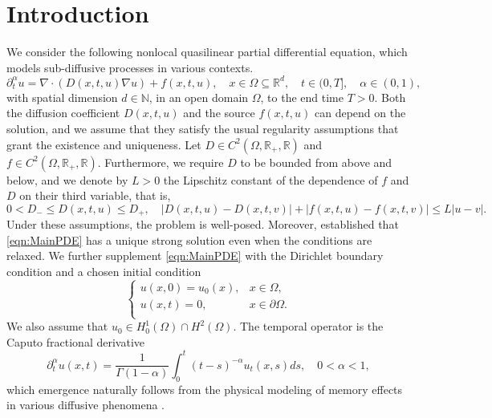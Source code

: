 \documentclass[12pt,a4paper]{article}
\begin{document}
\section{Introduction}
We consider the following nonlocal quasilinear partial differential equation, which models sub-diffusive processes in various contexts.
\begin{equation}\label{eqn:MainPDE}
	\partial^\alpha_t u = \nabla \cdot \left(D(x, t, u) \nabla u\right) + f(x,t,u), \quad x \in \Omega \subseteq \mathbb{R}^d, \quad t \in (0, T], \quad \alpha \in (0,1), 
\end{equation} 
with spatial dimension $d\in\mathbb{N}$, in an open domain $\Omega$, to the end time $T>0$. Both the diffusion coefficient $D(x,t,u)$ and the source $f(x,t,u)$ can depend on the solution, and we assume that they satisfy the usual regularity assumptions that grant the existence and uniqueness. Let $D\in C^2(\Omega, \mathbb{R}_+, \mathbb{R})$ and $f\in C^2(\Omega, \mathbb{R}_+, \mathbb{R})$. Furthermore, we require $D$ to be bounded from above and below, and we denote by $L>0$ the Lipschitz constant of the dependence of $f$ and $D$ on their third variable, that is,
\begin{equation}\label{eqn:Assumptions}
	0<D_-\leq D(x,t,u) \leq D_+, \quad |D(x,t,u)-D(x,t,v)| + |f(x,t,u) - f(x,t,v)| \leq L |u-v|.
\end{equation}
Under these assumptions, the problem is well-posed. Moreover, \cite{Zac12} established that \eqref{eqn:MainPDE} has a unique strong solution even when the conditions are relaxed. We further supplement \eqref{eqn:MainPDE} with the Dirichlet boundary condition and a chosen initial condition
\begin{equation}\label{eqn:MainPDEConditions}
	\begin{cases}
		u(x,0) = u_0(x), & x \in \Omega, \\
		u(x,t) = 0, & x \in \partial \Omega. \\
	\end{cases}
\end{equation}
We also assume that $u_0 \in H_0^1(\Omega) \cap H^2(\Omega)$. The temporal operator is the Caputo fractional derivative
\begin{equation}\label{eqn:Caputo}
	\partial^\alpha_t u(x,t) = \frac{1}{\Gamma(1-\alpha)} \int_0^t (t-s)^{-\alpha} u_t(x,s)ds, \quad 0<\alpha<1,
\end{equation}
which emergence naturally follows from the physical modeling of memory effects in various diffusive phenomena \cite{klafter2012fractional, metzler2000random}. 
\end{document}
